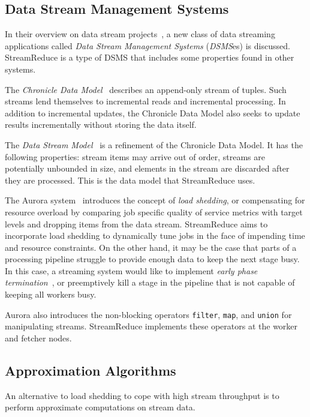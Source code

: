\documentclass[12pt,twocolumn]{article}
\begin{document}
\subsection{Data Stream Management Systems}
In their overview on data stream projects~\cite{Babcock:2002:MID:543613.543615},
a new class of data streaming applications
called \emph{Data Stream Management Systems} (\emph{DSMS}es) is discussed.
StreamReduce is a type of DSMS that includes some properties found in other systems.

The \emph{Chronicle Data Model}~\cite{Jagadish:1995:VMI:212433.220201} describes an
append-only stream of tuples. Such
streams lend themselves to incremental reads and incremental processing. In addition to
incremental
updates, the Chronicle Data Model also seeks to update results incrementally without storing
the
data itself.

The \emph{Data Stream Model}~\cite{Babcock:2002:MID:543613.543615} is a refinement of
the Chronicle
Data Model. It has the following properties: stream items may arrive out of order,
streams are potentially unbounded in size, and elements in the stream are discarded after
they are
processed. This is the data model that StreamReduce uses.

The Aurora system~\cite{Carney:2002:MSN:1287369.1287389} introduces the concept of
\emph{load shedding}, or compensating for
resource overload by comparing job specific quality of service metrics with target levels and
dropping items from the data stream.
StreamReduce aims to incorporate load shedding to dynamically tune jobs in the face of
impending time and resource constraints. On the other hand, it may be the case that
parts of a processing pipeline struggle to provide enough data to keep the next stage busy.
In this case, a streaming system would like to implement
\emph{early phase termination}~\cite{Rinard:2007:UEP:1297027.1297055}, or preemptively
kill
a stage in the pipeline that is not capable of keeping all workers busy.

Aurora also introduces the non-blocking operators
\texttt{filter}, \texttt{map}, and \texttt{union} for
manipulating streams. StreamReduce implements these operators at the worker and fetcher
nodes.

\subsection{Approximation Algorithms}
An alternative to load shedding to cope with high stream throughput is to perform
approximate
computations on stream data.
\end{document}
